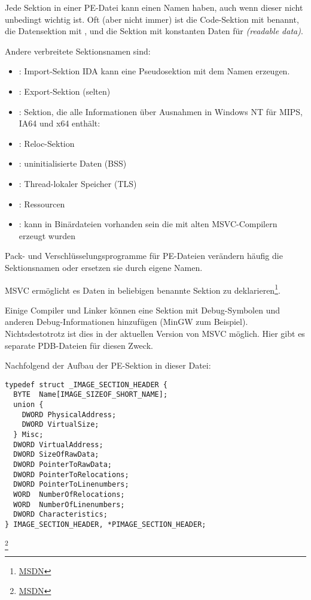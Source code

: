 Jede Sektion in einer PE-Datei kann einen Namen haben, auch wenn dieser nicht
unbedingt wichtig ist.
Oft (aber nicht immer) ist die Code-Sektion mit  benannt, die Datensektion
mit , und die Sektion mit konstanten Daten  für \emph{(readable data)}.

Andere verbreitete Sektionsnamen sind:

\begin{itemize}
\item {}: Import-Sektion
\ac{IDA} kann eine Pseudosektion mit dem Namen  erzeugen.
\item {}: Export-Sektion (selten)
\item {}: Sektion, die alle Informationen über Ausnahmen in Windows NT
für MIPS, \ac{IA64} und x64 enthält: 
\item {}: Reloc-Sektion
\item {}: uninitialisierte Daten (\ac{BSS})
\item {}: Thread-lokaler Speicher (\ac{TLS})
\item {}: Ressourcen
\item {}: kann in Binärdateien vorhanden sein die mit alten MSVC-Compilern
erzeugt wurden
\end{itemize}

Pack- und Verschlüsselungsprogramme für PE-Dateien verändern häufig die Sektionsnamen
oder ersetzen sie durch eigene Namen.

\ac{MSVC} ermöglicht es Daten in beliebigen benannte Sektion zu
deklarieren\footnote{\href{http://go.yurichev.com/17047}{MSDN}}.

Einige Compiler und Linker können eine Sektion mit Debug-Symbolen und anderen
Debug-Informationen hinzufügen (MinGW zum Beispiel).
Nichtsdestotrotz ist dies in der aktuellen Version von \ac{MSVC} möglich.
Hier gibt es separate \gls{PDB}-Dateien für diesen Zweck.

Nachfolgend der Aufbau der PE-Sektion in dieser Datei:

\begin{lstlisting}
typedef struct _IMAGE_SECTION_HEADER {
  BYTE  Name[IMAGE_SIZEOF_SHORT_NAME];
  union {
    DWORD PhysicalAddress;
    DWORD VirtualSize;
  } Misc;
  DWORD VirtualAddress;
  DWORD SizeOfRawData;
  DWORD PointerToRawData;
  DWORD PointerToRelocations;
  DWORD PointerToLinenumbers;
  WORD  NumberOfRelocations;
  WORD  NumberOfLinenumbers;
  DWORD Characteristics;
} IMAGE_SECTION_HEADER, *PIMAGE_SECTION_HEADER;
\end{lstlisting}
\footnote{\href{http://go.yurichev.com/17048}{MSDN}}

